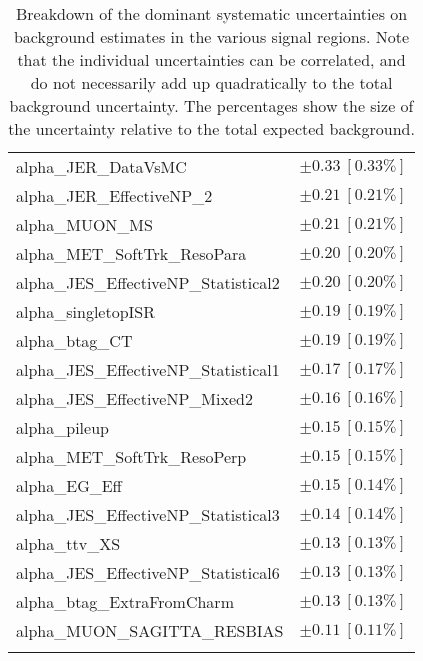 \begin{table}
\begin{center}
\begin{tabular*}{\textwidth}{@{\extracolsep{\fill}}lc}
alpha\_JER\_DataVsMC         & $\pm 0.33\ [0.33\%] $       \\
alpha\_JER\_EffectiveNP\_2         & $\pm 0.21\ [0.21\%] $       \\
alpha\_MUON\_MS         & $\pm 0.21\ [0.21\%] $       \\
alpha\_MET\_SoftTrk\_ResoPara         & $\pm 0.20\ [0.20\%] $       \\
alpha\_JES\_EffectiveNP\_Statistical2         & $\pm 0.20\ [0.20\%] $       \\
alpha\_singletopISR         & $\pm 0.19\ [0.19\%] $       \\
alpha\_btag\_CT         & $\pm 0.19\ [0.19\%] $       \\
alpha\_JES\_EffectiveNP\_Statistical1         & $\pm 0.17\ [0.17\%] $       \\
alpha\_JES\_EffectiveNP\_Mixed2         & $\pm 0.16\ [0.16\%] $       \\
alpha\_pileup         & $\pm 0.15\ [0.15\%] $       \\
alpha\_MET\_SoftTrk\_ResoPerp         & $\pm 0.15\ [0.15\%] $       \\
alpha\_EG\_Eff         & $\pm 0.15\ [0.14\%] $       \\
alpha\_JES\_EffectiveNP\_Statistical3         & $\pm 0.14\ [0.14\%] $       \\
alpha\_ttv\_XS         & $\pm 0.13\ [0.13\%] $       \\
alpha\_JES\_EffectiveNP\_Statistical6         & $\pm 0.13\ [0.13\%] $       \\
alpha\_btag\_ExtraFromCharm         & $\pm 0.13\ [0.13\%] $       \\
alpha\_MUON\_SAGITTA\_RESBIAS         & $\pm 0.11\ [0.11\%] $       \\
\noalign{\smallskip}\hline\noalign{\smallskip}
\end{tabular*}
\end{center}
\caption[Breakdown of uncertainty on background estimates]{
Breakdown of the dominant systematic uncertainties on background estimates in the various signal regions.
Note that the individual uncertainties can be correlated, and do not necessarily add up quadratically to 
the total background uncertainty. The percentages show the size of the uncertainty relative to the total expected background.
\label{table.results.bkgestimate.uncertainties.VRtt1onEM_cuts}}
\end{table}
%